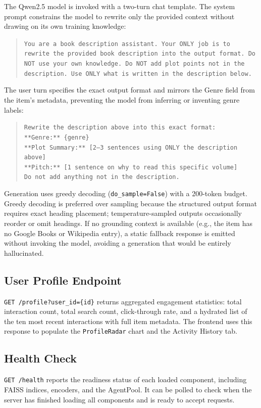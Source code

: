The Qwen2.5 model is invoked with a two-turn chat template.
The system prompt constrains the model to rewrite only the provided context without drawing on its own training knowledge:

\begin{quote}
\texttt{You are a book description assistant. Your ONLY job is to rewrite the provided book description into the output format. Do NOT use your own knowledge. Do NOT add plot points not in the description. Use ONLY what is written in the description below.}
\end{quote}

The user turn specifies the exact output format and mirrors the Genre field from the item's metadata, preventing the model from inferring or inventing genre labels:

\begin{quote}
\texttt{Rewrite the description above into this exact format:}\\
\texttt{**Genre:** \{genre\}}\\
\texttt{**Plot Summary:** [2--3 sentences using ONLY the description above]}\\
\texttt{**Pitch:** [1 sentence on why to read this specific volume]}\\
\texttt{Do not add anything not in the description.}
\end{quote}

Generation uses greedy decoding (\texttt{do\_sample=False}) with a 200-token budget.
Greedy decoding is preferred over sampling because the structured output format requires exact heading placement; temperature-sampled outputs occasionally reorder or omit headings.
If no grounding context is available (e.g., the item has no Google Books or Wikipedia entry), a static fallback response is emitted without invoking the model, avoiding a generation that would be entirely hallucinated.

\subsection{User Profile Endpoint}

\texttt{GET /profile?user\_id=\{id\}} returns aggregated engagement statistics: total interaction count, total search count, click-through rate, and a hydrated list of the ten most recent interactions with full item metadata.
The frontend uses this response to populate the \texttt{ProfileRadar} chart and the Activity History tab.

\subsection{Health Check}

\texttt{GET /health} reports the readiness status of each loaded component, including FAISS indices, encoders, and the AgentPool.
It can be polled to check when the server has finished loading all components and is ready to accept requests.
